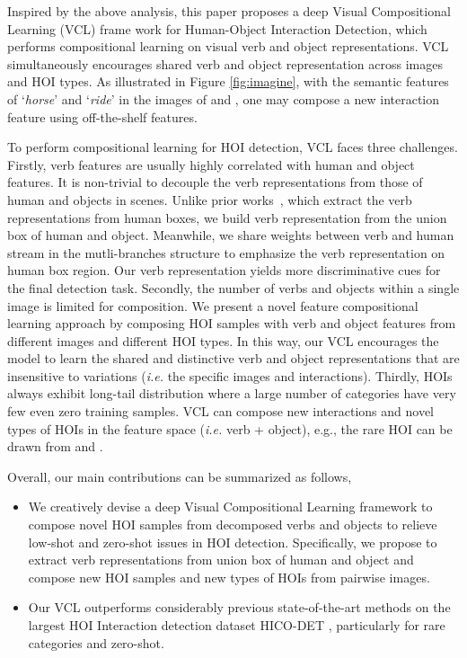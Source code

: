 \documentclass[runningheads]{llncs}
\newcommand{\ie}{\textit{i.e. }}
\begin{document}
Inspired by the above analysis, this paper proposes a deep Visual Compositional Learning (VCL) frame work for Human-Object Interaction Detection, which performs compositional learning on visual verb and object representations. VCL simultaneously encourages shared verb and object representation across images and HOI types.
As illustrated in Figure \ref{fig:imagine}, with the semantic features of `\textit{horse}' and `\textit{ride}' in the images of  and , one may compose a new interaction feature  using off-the-shelf features.


To perform compositional learning for HOI detection, VCL faces three challenges. Firstly, verb features are usually highly correlated with human and object features. It is non-trivial to decouple the verb representations from those of human and objects in scenes. Unlike prior works~\cite{gao2018ican, gupta2018no}, which extract the verb representations from human boxes, we build verb representation from the union box of human and object. Meanwhile, we share weights between verb and human stream in the mutli-branches structure to emphasize the verb representation on human box region. Our verb representation yields more discriminative cues for the final detection task. Secondly, the number of verbs and objects within a single image is limited for composition. We present a novel feature compositional learning approach by composing HOI samples with verb and object features from different images and different HOI types.
In this way, our VCL encourages the model to learn the shared and distinctive verb and object representations that are insensitive to variations (\ie the specific images and interactions). Thirdly, HOIs always exhibit long-tail distribution where a large number of categories have very few even zero training samples. VCL can compose new interactions and novel types of HOIs in the feature space (\ie verb + object), e.g., the rare HOI  can be drawn from  and .

Overall, our main contributions can be summarized as follows,



\begin{itemize}
\item We creatively devise a deep Visual Compositional Learning framework to compose novel HOI samples from decomposed verbs and objects to relieve low-shot and zero-shot issues in HOI detection. Specifically, we propose to extract verb representations from union box of human and object and compose new HOI samples and new types of HOIs from pairwise images.
\item Our VCL outperforms considerably previous state-of-the-art methods on the largest HOI Interaction detection dataset HICO-DET \cite{chao2018learning}, particularly for rare categories and zero-shot.
\end{itemize}
\end{document}
